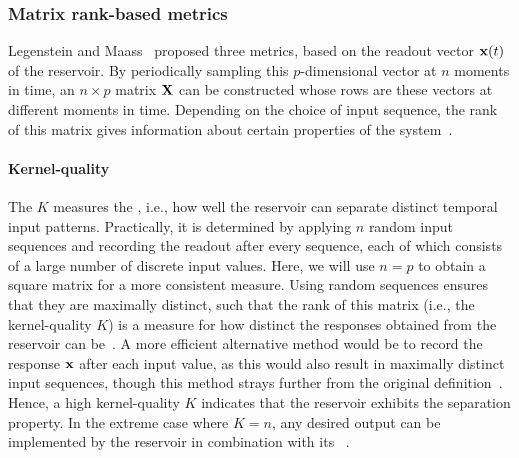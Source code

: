 \subsubsection{Matrix rank-based metrics}\label{sec:1:RC_metrics_KQ}
Legenstein and Maass~\cite{WhatMakesPowerful} proposed three metrics, based on the readout vector $\boldsymbol{\mathbf{x}}(t)$ of the reservoir.
By periodically sampling this $p$-dimensional vector at $n$ moments in time, an $n \times p$ matrix $\boldsymbol{\mathbf{X}}$ can be constructed whose rows are these vectors at different moments in time.
Depending on the choice of input sequence, the rank of this matrix gives information about certain properties of the system~\cite{RC_ASI}.

\paragraph{Kernel-quality}
The  $K$ measures the , i.e., how well the reservoir can separate distinct temporal input patterns.
Practically, it is determined by applying $n$ random input sequences and recording the readout after every sequence, each of which consists of a large number of discrete input values.
Here, we will use $n=p$ to obtain a square matrix for a more consistent measure.
Using random sequences ensures that they are maximally distinct, such that the rank of this matrix (i.e., the kernel-quality $K$) is a measure for how distinct the responses obtained from the reservoir can be~\cite{Vidamour_2022}.
A more efficient alternative method would be to record the response $\boldsymbol{\mathbf{x}}$ after each input value, as this would also result in maximally distinct input sequences, though this method strays further from the original definition~\cite{RC_HierarchicalNeuroevolution,RCbenchmarksReview1}.
Hence, a high kernel-quality $K$ indicates that the reservoir exhibits the separation property.
In the extreme case where $K=n$, any desired output can be implemented by the reservoir in combination with its ~\cite{WhatMakesPowerful}.

